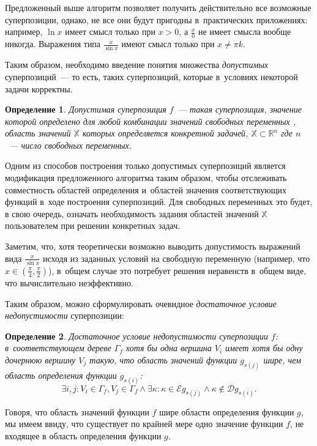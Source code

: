 \documentclass[12pt,a4paper]{amsart}
\newtheorem{defin}{Определение}
\begin{document}
Предложенный выше алгоритм позволяет получить действительно все возможные
суперпозиции, однако, не все они будут пригодны в~практических приложениях:
например, $\ln x$ имеет смысл только при $x > 0$, а $\frac{x}{0}$ не имеет
смысла вообще никогда. Выражения типа $\frac{x}{\sin x}$ имеют смысл только
при $x \neq \pi k$.

Таким образом, необходимо введение понятия множества \emph{допустимых}
суперпозиций~--- то есть, таких суперпозиций, которые в~условиях некоторой
задачи корректны.

\begin{defin}
  Допустимая суперпозиция $f$~--- такая суперпозиция, значение которой
  определено для любой комбинации значений свободных переменных , область
  значений $\mathbb{X}$ которых определяется конкретной задачей,
  $\mathbb{X} \subset \mathbb{R}^n$ где $n$~--- число свободных переменных.
\end{defin}

Одним из способов построения только допустимых суперпозиций является
модификация предложенного алгоритма таким образом, чтобы отслеживать
совместность областей определения и~областей значения соответствующих
функций в~ходе построения суперпозиций. Для свободных переменных это будет,
в свою очередь, означать необходимость задания областей значений
$\mathbb{X}$ пользователем при решении конкретных задач.

Заметим, что, хотя теоретически возможно выводить допустимость выражений
вида $\frac{x}{\sin x}$ исходя из заданных условий на свободную переменную
(например, что $x \in (\frac{\pi}{4}, \frac{\pi}{2})$), в~общем случае это
потребует решения неравенств в~общем виде, что вычислительно неэффективно.

Таким образом, можно сформулировать очевидное \emph{достаточное условие
недопустимости} суперпозиции:

\begin{defin}
  Достаточное условие недопустимости суперпозиции $f$: в~соответствующем дереве
  $\Gamma_f$ хотя бы одна вершина $V_i$ имеет хотя бы одну дочернюю вершину
  $V_j$ такую, что область значений функции $g_{s(j)}$ шире, чем область
  определения функции $g_{s(i)}$:
  \[
  \exists i, j : V_i \in \Gamma_f, V_j \in \Gamma_f \wedge \exists \kappa :
	\kappa \in \mathcal{E} g_{s(j)} \wedge \kappa \notin \mathcal{D} g_{s(i)}.
  \]
\end{defin}

Говоря, что область значений функции $f$ шире области определения функции
$g$, мы имеем ввиду, что существует по крайней мере одно значение функции
$f$, не входящее в область определения функции $g$.
\end{document}
